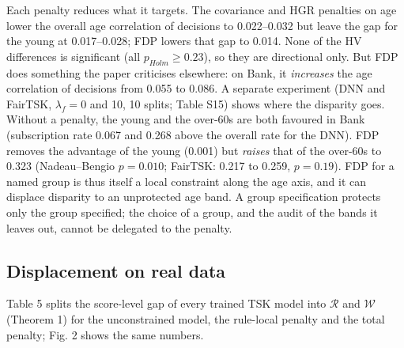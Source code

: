 \documentclass[pdflatex,sn-basic,Numbered,lineno]{sn-jnl}
\begin{document}
Each penalty reduces what it targets. The covariance and HGR penalties on age lower the overall age correlation of decisions to 0.022--0.032 but leave the gap for the young at 0.017--0.028; FDP lowers that gap to 0.014. None of the HV differences is significant (all \(p_{Holm} \geq 0.23\)), so they are directional only. But FDP does something the paper criticises elsewhere: on Bank, it \emph{increases} the age correlation of decisions from 0.055 to 0.086. A separate experiment (DNN and FairTSK, \(\lambda_f = 0\) and 10, 10 splits; Table S15) shows where the disparity goes. Without a penalty, the young and the over-60s are both favoured in Bank (subscription rate 0.067 and 0.268 above the overall rate for the DNN). FDP removes the advantage of the young (0.001) but \emph{raises} that of the over-60s to 0.323 (Nadeau--Bengio \(p = 0.010\); FairTSK: 0.217 to 0.259, \(p = 0.19\)). FDP for a named group is thus itself a local constraint along the age axis, and it can displace disparity to an unprotected age band. A group specification protects only the group specified; the choice of a group, and the audit of the bands it leaves out, cannot be delegated to the penalty.

\hypertarget{displacement-on-real-data}{%
\subsection{Displacement on real data}\label{displacement-on-real-data}}

Table 5 splits the score-level gap of every trained TSK model into \(\mathcal R\) and \(\mathcal W\) (Theorem 1) for the unconstrained model, the rule-local penalty and the total penalty; Fig. 2 shows the same numbers.
\end{document}
